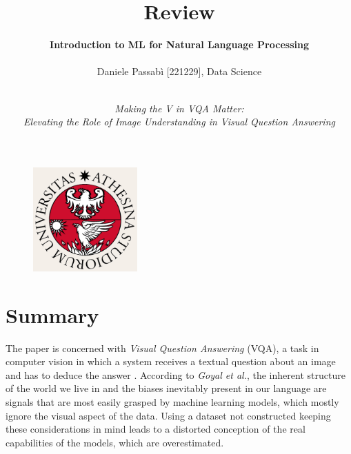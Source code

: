 \documentclass[letterpaper,11pt]{article}
\begin{document}
\pagecolor{ivory}

\title{\textbf{Review}}
\author{\textbf{Introduction to ML for Natural Language Processing}\\ \\ Daniele Passabì [221229], Data Science\\}

\date{\textit{\\Making the V in VQA Matter:\\Elevating the Role of Image Understanding in Visual Question Answering}}
\maketitle
\thispagestyle{empty}

\begin{figure}[H] 
  \centering
  \includegraphics[width=4cm]{logo.png}
\end{figure}


\newpage
\clearpage
\pagecolor{white}




\section{Summary}

The paper \cite{goyal2017making} is concerned with \textit{Visual Question Answering} (VQA), a task in computer vision in which a system receives a textual question about an image and has to deduce the answer \cite{kafle2017visual}. According to \textit{Goyal et al.}, the inherent structure of the world we live in and the biases inevitably present in our language are signals that are most easily grasped by machine learning models, which mostly ignore the visual aspect of the data. Using a dataset not constructed keeping these considerations in mind leads to a distorted conception of the real capabilities of the models, which are overestimated.
\end{document}
